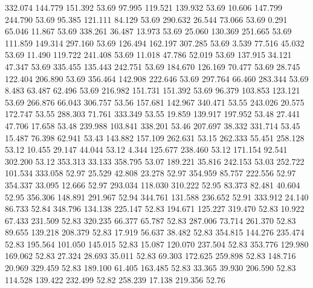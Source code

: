  332.074  144.779  151.392        53.69
  97.995  119.521  139.932        53.69
  10.606  147.799  244.790        53.69
  95.385  121.111   84.129        53.69
 290.632   26.544   73.066        53.69
   0.291   65.046   11.867        53.69
 338.261   36.487   13.973        53.69
  25.060  130.369  251.665        53.69
 111.859  149.314  297.160        53.69
 126.494  162.197  307.285        53.69
   3.539   77.516   45.032        53.69
  11.490  119.722  241.408        53.69
  11.018   47.786   52.019        53.69
 137.915   34.121   47.347        53.69
 335.455  135.443  242.751        53.69
 184.670  126.169   70.477        53.69
  28.745  122.404  206.890        53.69
 356.464  142.908  222.646        53.69
 297.764   66.460  283.344        53.69
   8.483   63.487   62.496        53.69
 216.982  151.731  151.392        53.69
  96.379  103.853  123.121        53.69
 266.876   66.043  306.757        53.56
 157.681  142.967  340.471        53.55
 243.026   20.575  172.747        53.55
 288.303   71.761  333.349        53.55
  19.859  139.917  197.952        53.48
  27.441   47.706   17.658        53.48
 239.988  103.841  338.201        53.46
 207.697   38.332  331.714        53.45
  15.487   76.398   62.941        53.43
 143.882  157.109  262.631        53.15
 262.333   55.451  258.128        53.12
  10.455   29.147   44.044        53.12
   4.344  125.677  238.460        53.12
 171.154   92.541  302.200        53.12
 353.313   33.133  358.795        53.07
 189.221   35.816  242.153        53.03
 252.722  101.534  333.058        52.97
  25.529   42.808   23.278        52.97
 354.959   85.757  222.556        52.97
 354.337   33.095   12.666        52.97
 293.034  118.030  310.222        52.95
  83.373   82.481   40.604        52.95
 356.306  148.891  291.967        52.94
 344.761  131.588  236.652        52.91
 333.912   24.140   86.733        52.84
 348.796  134.138  225.147        52.83
 194.671  125.227  319.470        52.83
  10.922   67.433  231.509        52.83
 320.235   66.377   65.787        52.83
 287.006   73.714  261.370        52.83
  89.655  139.218  208.379        52.83
  17.919   56.637   38.482        52.83
 354.815  144.276  235.474        52.83
 195.564  101.050  145.015        52.83
  15.087  120.070  237.504        52.83
 353.776  129.980  169.062        52.83
  27.324   28.693   35.011        52.83
  69.303  172.625  259.898        52.83
 148.716   20.969  329.459        52.83
 189.100   61.405  163.485        52.83
  33.365   39.930  206.590        52.83
 114.528  139.422  232.499        52.82
 258.239   17.138  219.356        52.76
